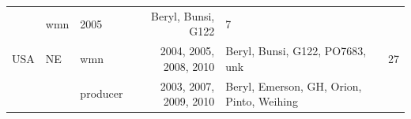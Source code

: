 \documentclass[fleqn,10pt,lineno]{wlpeerj} %
\theoremstyle{definition}
\theoremstyle{definition}
\theoremstyle{definition}
\theoremstyle{remark}
\begin{document}
\begin{longtable}[]{@{}lllrlr@{}}
\begin{minipage}[t]{0.08\columnwidth}
\strut
\end{minipage} & \begin{minipage}[t]{0.12\columnwidth}\raggedright\strut
wmn\strut
\end{minipage} & \begin{minipage}[t]{0.19\columnwidth}\raggedleft\strut
2005\strut
\end{minipage} & \begin{minipage}[t]{0.29\columnwidth}\raggedright\strut
Beryl, Bunsi, G122\strut
\end{minipage} & \begin{minipage}[t]{0.04\columnwidth}\raggedleft\strut
7\strut
\end{minipage}\tabularnewline
\begin{minipage}[t]{0.11\columnwidth}\raggedright\strut
USA\strut
\end{minipage} & \begin{minipage}[t]{0.08\columnwidth}\raggedright\strut
NE\strut
\end{minipage} & \begin{minipage}[t]{0.12\columnwidth}\raggedright\strut
wmn\strut
\end{minipage} & \begin{minipage}[t]{0.19\columnwidth}\raggedleft\strut
2004, 2005, 2008, 2010\strut
\end{minipage} & \begin{minipage}[t]{0.29\columnwidth}\raggedright\strut
Beryl, Bunsi, G122, PO7683, unk\strut
\end{minipage} & \begin{minipage}[t]{0.04\columnwidth}\raggedleft\strut
27\strut
\end{minipage}\tabularnewline
\begin{minipage}[t]{0.11\columnwidth}\raggedright\strut
\strut
\end{minipage} & \begin{minipage}[t]{0.08\columnwidth}\raggedright\strut
\strut
\end{minipage} & \begin{minipage}[t]{0.12\columnwidth}\raggedright\strut
producer\strut
\end{minipage} & \begin{minipage}[t]{0.19\columnwidth}\raggedleft\strut
2003, 2007, 2009, 2010\strut
\end{minipage} & \begin{minipage}[t]{0.29\columnwidth}\raggedright\strut
Beryl, Emerson, GH, Orion, Pinto, Weihing\strut
\end{minipage} & \begin{minipage}[t]{0.04\columnwidth}\raggedleft\strut

\end{minipage}
\end{longtable}
\end{document}
